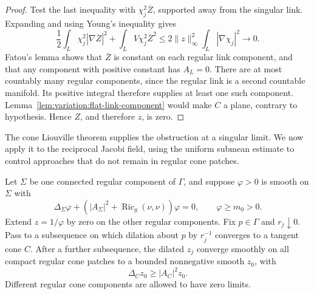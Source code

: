 \begin{proof}
Test the last inequality with $\chi_j^2\overline Z$, supported away
from the singular link.  Expanding and using Young's inequality gives
\[
 \frac12\int_L\chi_j^2|\nabla\overline Z|^2
 +\int_LV\chi_j^2\overline Z^2
 \leq2\|z\|_\infty^2\int_L|\nabla\chi_j|^2
 \longrightarrow0.
\]
Fatou's lemma shows that $\overline Z$ is constant on each regular
link component, and that any component with positive constant has
$A_L=0$.  There are at most countably many regular components, since
the regular link is a second countable manifold.  Its positive
integral therefore supplies at least one such component.
Lemma~\ref{lem:variation:flat-link-component} would make $C$ a plane,
contrary to hypothesis.  Hence $Z$, and therefore $z$, is zero.
\end{proof}

The cone Liouville theorem supplies the obstruction at a singular
limit. We now apply it to the reciprocal Jacobi field, using the
uniform submean estimate to control approaches that do not remain
in regular cone patches.

\begin{lemma}
\label{lem:variation:reciprocal-compactness}
Let $\Sigma$ be one connected regular component of $\Gamma$, and
suppose $\varphi>0$ is smooth on $\Sigma$ with
\[
 \Delta_\Sigma\varphi+
 (|A_\Sigma|^2+\operatorname{Ric}_g(\nu,\nu))\varphi=0,
 \qquad \varphi\geq m_0>0.
\]
Extend $z=1/\varphi$ by zero on the other regular components.
Fix $p\in\Gamma$ and $r_j\downarrow0$.  Pass to a subsequence on
which dilation about $p$ by $r_j^{-1}$ converges to a tangent cone
$C$.  After a further subsequence, the dilated $z_j$ converge smoothly
on all compact regular cone patches to a bounded nonnegative smooth
$z_0$, with
\[
 \Delta_Cz_0\geq |A_C|^2z_0.
\]
Different regular cone components are allowed to have zero limits.
\end{lemma}

